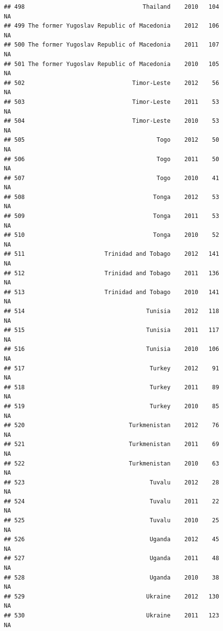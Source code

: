 \documentclass[
]{book}
\begin{document}
\begin{verbatim}
## 498                                  Thailand    2010   104              NA
## 499 The former Yugoslav Republic of Macedonia    2012   106              NA
## 500 The former Yugoslav Republic of Macedonia    2011   107              NA
## 501 The former Yugoslav Republic of Macedonia    2010   105              NA
## 502                               Timor-Leste    2012    56              NA
## 503                               Timor-Leste    2011    53              NA
## 504                               Timor-Leste    2010    53              NA
## 505                                      Togo    2012    50              NA
## 506                                      Togo    2011    50              NA
## 507                                      Togo    2010    41              NA
## 508                                     Tonga    2012    53              NA
## 509                                     Tonga    2011    53              NA
## 510                                     Tonga    2010    52              NA
## 511                       Trinidad and Tobago    2012   141              NA
## 512                       Trinidad and Tobago    2011   136              NA
## 513                       Trinidad and Tobago    2010   141              NA
## 514                                   Tunisia    2012   118              NA
## 515                                   Tunisia    2011   117              NA
## 516                                   Tunisia    2010   106              NA
## 517                                    Turkey    2012    91              NA
## 518                                    Turkey    2011    89              NA
## 519                                    Turkey    2010    85              NA
## 520                              Turkmenistan    2012    76              NA
## 521                              Turkmenistan    2011    69              NA
## 522                              Turkmenistan    2010    63              NA
## 523                                    Tuvalu    2012    28              NA
## 524                                    Tuvalu    2011    22              NA
## 525                                    Tuvalu    2010    25              NA
## 526                                    Uganda    2012    45              NA
## 527                                    Uganda    2011    48              NA
## 528                                    Uganda    2010    38              NA
## 529                                   Ukraine    2012   130              NA
## 530                                   Ukraine    2011   123              NA

\end{verbatim}
\end{document}
